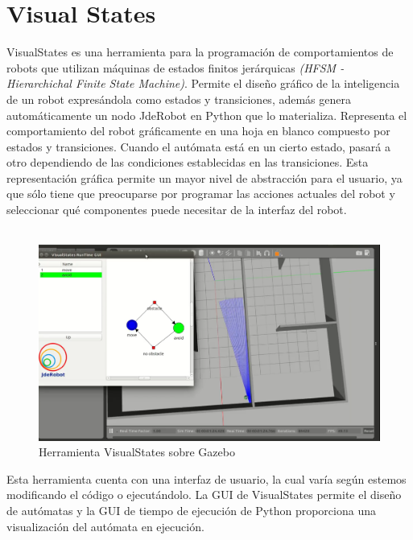 \section{Visual States}
\hspace{1cm} VisualStates es una herramienta para la programación de comportamientos de robots que utilizan máquinas de estados finitos jerárquicas \textit{(HFSM - Hierarchichal Finite State Machine)}. Permite el diseño gráfico de la inteligencia de un robot expresándola como estados y transiciones, además genera automáticamente un nodo JdeRobot en Python que lo materializa. Representa el comportamiento del robot gráficamente en una hoja en blanco compuesto por estados y transiciones. Cuando el autómata está en un cierto estado, pasará a otro dependiendo de las condiciones establecidas en las transiciones. Esta representación gráfica permite un mayor nivel de abstracción para el usuario, ya que sólo tiene que preocuparse por programar las acciones actuales del robot y seleccionar qué componentes puede necesitar de la interfaz del robot.
\\
\\
\begin{figure}[H]
	\begin{center}
		\includegraphics[width=1\textwidth]{imag/IMG19.png}
				\caption{Herramienta VisualStates sobre Gazebo} 
	\label{fig:Visual States.}	
	\end{center}
\end{figure}

\hspace{1cm} Esta herramienta cuenta con una interfaz de usuario, la cual varía según estemos modificando el código o ejecutándolo. La GUI de VisualStates permite el diseño de autómatas y la GUI de tiempo de ejecución de Python proporciona una visualización del autómata en ejecución. 

